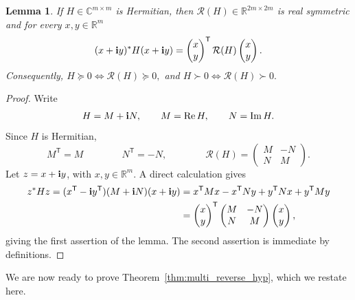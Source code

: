 \documentclass[11pt]{article}
\newtheorem{lemma}[thm]{Lemma}
\begin{document}
\begin{lemma}\label{lem:complex_real_psd}
If $H\in\mathbb{C}^{m\times m}$ is Hermitian, then 
$\mathcal{R}(H)\in\mathbb{R}^{2m\times 2m}$ is real symmetric and
for every $x,y\in\mathbb{R}^m$
\[
(x+{\bf i}y)^*H(x+{\bf i}y)
=
\begin{pmatrix}
x\\y
\end{pmatrix}^{\mathsf T}
\mathcal{R}(H)
\begin{pmatrix}
x\\y
\end{pmatrix}.
\]
Consequently, $
H\succeq 0
\Longleftrightarrow
\mathcal{R}(H)\succeq 0,
$
and
$
H\succ 0
\Longleftrightarrow
\mathcal{R}(H)\succ 0.
$
\end{lemma}
\begin{proof}
Write
\[
H=M+{\bf i}N,
\qquad
M=\operatorname{Re}H,
\qquad
N=\operatorname{Im}H.
\]
Since \(H\) is Hermitian,
\[
M^{\mathsf T}=M
\qquad\qquad
N^{\mathsf T}=-N,
\qquad\qquad
\mathcal{R}(H)
=
\begin{pmatrix}
M&-N\\
N&M
\end{pmatrix}.
\]
Let \(z=x+{\bf i}y\), with \(x,y\in\mathbb{R}^m\). A direct
calculation gives
\[
\begin{aligned}
z^*Hz
=
(x^{\mathsf T}-{\bf i}y^{\mathsf T})
(M+{\bf i}N)
(x+{\bf i}y)
&=
x^{\mathsf T}Mx-x^{\mathsf T}Ny
+y^{\mathsf T}Nx+y^{\mathsf T}My\\
&=
\begin{pmatrix}
x\\y
\end{pmatrix}^{\mathsf T}
\begin{pmatrix}
M&-N\\
N&M
\end{pmatrix}
\begin{pmatrix}
x\\y
\end{pmatrix},
\end{aligned}
\]
giving the first assertion of the lemma. The second assertion is immediate by definitions.
\end{proof}

We are now ready to prove Theorem~\ref{thm:multi_reverse_hyp}, which we restate here.
\end{document}
